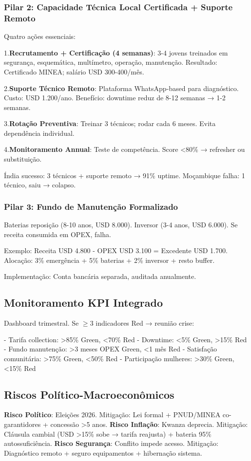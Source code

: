 \documentclass[12pt, a4paper]{article}
\begin{document}
\subsubsection{Pilar 2: Capacidade Técnica Local Certificada + Suporte Remoto}

Quatro ações essenciais:

1.\textbf{Recrutamento + Certificação (4 semanas)}: 3-4 jovens treinados em segurança, esquemática, multímetro, operação, manutenção. Resultado: Certificado MINEA; salário USD 300-400/mês.

2.\textbf{Suporte Técnico Remoto}: Plataforma WhatsApp-based para diagnóstico. Custo: USD 1.200/ano. Benefício: downtime reduz de 8-12 semanas → 1-2 semanas.

3.\textbf{Rotação Preventiva}: Treinar 3 técnicos; rodar cada 6 meses. Evita dependência individual.

4.\textbf{Monitoramento Annual}: Teste de competência. Score <80\% → refresher ou substituição.

Índia sucesso: 3 técnicos + suporte remoto → 91\% uptime. Moçambique falha: 1 técnico, saiu → colapso.

\subsubsection{Pilar 3: Fundo de Manutenção Formalizado}

Baterias reposição (8-10 anos, USD 8.000). Inversor (3-4 anos, USD 6.000). Se receita consumida em OPEX, falha.

Exemplo: Receita USD 4.800 - OPEX USD 3.100 = Excedente USD 1.700. Alocação: 3\% emergência + 5\% baterias + 2\% inversor + resto buffer.

Implementação: Conta bancária separada, auditada anualmente.

\subsection{Monitoramento KPI Integrado}

Dashboard trimestral. Se $\geq$3 indicadores Red → reunião crise:

- Tarifa collection: >85\% Green, <70\% Red
- Downtime: <5\% Green, >15\% Red
- Fundo manutenção: >3 meses OPEX Green, <1 mês Red
- Satisfação comunitária: >75\% Green, <50\% Red
- Participação mulheres: >30\% Green, <15\% Red

\subsection{Riscos Político-Macroeconômicos}
\textbf{Risco Político}: Eleições 2026. Mitigação: Lei formal + PNUD/MINEA co-garantidores + concessão >5 anos.
\textbf{Risco Inflação}: Kwanza deprecia. Mitigação: Cláusula cambial (USD >15\% sobe → tarifa reajusta) + bateria 95\% autossuficiência.
\textbf{Risco Segurança}: Conflito impede acesso. Mitigação: Diagnóstico remoto + seguro equipamentos + hibernação sistema.
\end{document}
